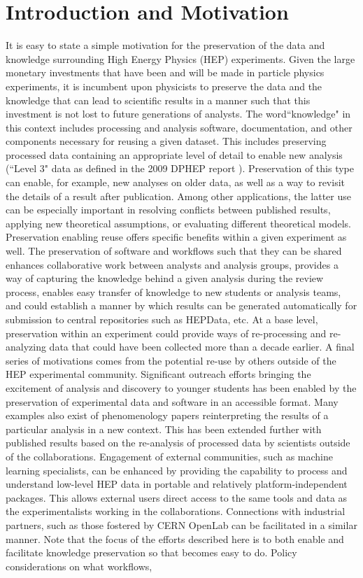 \documentclass[11pt]{article}
\begin{document}
\hypertarget{introduction}{%
\section{Introduction and Motivation}\label{introduction}}
It is easy to state a simple motivation for the preservation of the data and knowledge surrounding High Energy Physics (HEP) experiments. Given the large monetary investments that have been and will be made in particle physics experiments, it is incumbent upon physicists to preserve the data and the knowledge that can lead to scientific results in a manner such that this investment is not lost to future generations of analysts.  The word``knowledge" in this context includes processing and analysis software, documentation, and other components necessary for reusing a given dataset. This includes preserving processed data containing an appropriate level of detail to enable new analysis (``Level 3" data as defined in the 2009 DPHEP report\cite{DPHEP09} ). Preservation of this type can enable, for example, new analyses on older data, as well as a way to revisit the details of a result after publication.  Among other applications, the latter use can be especially important in resolving conflicts between published results, applying new theoretical assumptions, or evaluating different theoretical models.  Preservation enabling reuse offers specific benefits within a given experiment as well.  The preservation of software and workflows such that they can be shared enhances collaborative work between analysts and analysis groups, provides a way of capturing the knowledge behind a given analysis during the review process, enables easy transfer of knowledge to new students or analysis teams, and could establish a manner by which results can be generated automatically for submission to central repositories such as HEPData\cite{HEPDATA}, etc.  At a base level, preservation within an experiment could provide ways of re-processing and re-analyzing data that could have been collected more than a decade earlier. A final series of motivations comes from the potential re-use by others outside of the HEP experimental community.  Significant outreach efforts bringing the excitement of analysis and discovery to younger students has been enabled by the preservation of experimental data and software in an accessible format.  Many examples also exist of phenomenology papers reinterpreting the results of a particular analysis in a new context.  This has been extended further with published results based on the re-analysis of processed data by scientists outside of the collaborations\cite{MITQCD}.  Engagement of external communities, such as machine learning specialists, can be enhanced by providing the capability to process and understand low-level HEP data in portable and relatively platform-independent packages. This allows external users direct access to the same tools and data as the experimentalists working in the collaborations.  Connections with industrial partners, such as those fostered by CERN OpenLab\cite{Openlab} can be facilitated in a similar manner.  Note that the focus of the efforts described here is to both enable and facilitate knowledge preservation so that becomes easy to do.  Policy considerations on what workflows, 
\end{document}
